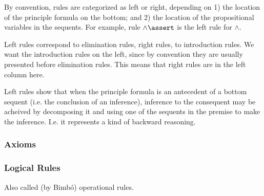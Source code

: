 \documentclass{article}
\begin{document}
By convention, rules are categorized as left or right, depending on 1)
the location of the principle formula on the bottom; and 2) the
location of the propositional variables in the sequents. For example,
rule \(\land\linfer\) is the left rule for \(\land\).

Left rules correspond to elimination rules, right rules, to
introduction rules. We want the introduction rules on the left, since
by convention they are usually presented before elimination rules.
This means that right rules are in the left column here.

Left rules show that when the principle formula is an antecedent of a
bottom sequent (i.e. the conclusion of an inference), inference to the
consequent may be acheived by decomposing it and using one of the
sequents in the premise to make the inference. I.e. it represents a
kind of backward reasoning.

\subsubsection{Axioms}


\subsubsection{Logical Rules}

Also called (by Bimbó) operational rules.

\end{document}
